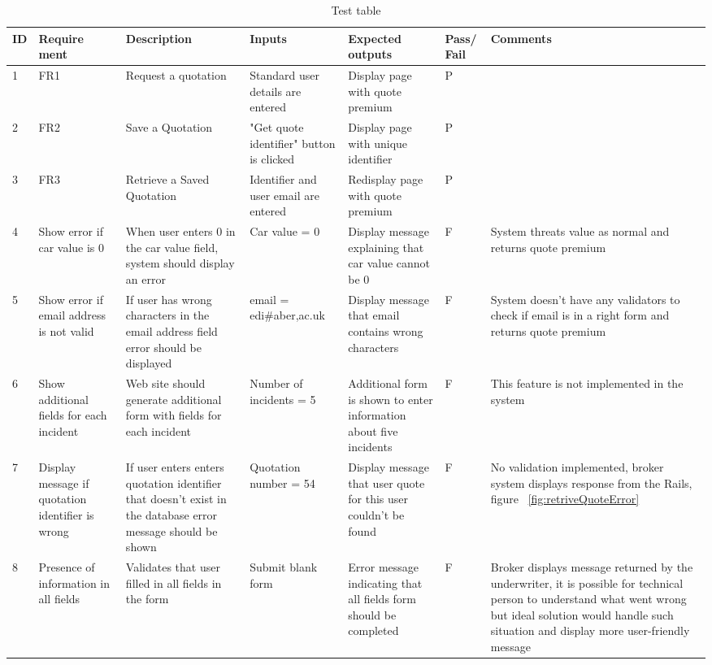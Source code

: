 \documentclass[10pt,a4paper,headinclude=true,twoside]{report}
\begin{document}
\begin{center}
\begin{table}


\begin{tabularx}{\textwidth} { |p{0.14cm}|p{0.88cm}|X|X|X|p{0.6cm}|X|}
   \hline                        
  ID &  Require ment & Description &  Inputs  &  Expected outputs & Pass/ Fail & Comments  \\ \hline
   1 & FR1 &  Request a quotation & Standard user details are entered &  Display page with quote premium & P &  \\ \hline
   2 & FR2 & Save a Quotation & "Get quote identifier" button is clicked &  Display page with unique identifier & P &  \\ \hline
   3 & FR3 & Retrieve a Saved Quotation & Identifier and user email are entered &  Redisplay page with quote premium & P & \\ \hline
   4 & Show error if car value is 0 & When user enters 0 in the car value field, system should display an error &  Car value = 0 &  Display message explaining that car value cannot be 0 & F & System threats value as normal and returns quote premium\\ \hline
   5 & Show error if email address is not valid & If user has wrong characters in the email address field error should be displayed& email = edi\#aber,ac.uk &  Display message that email contains wrong characters & F & System doesn't have any validators to check if email is in a right form and returns quote premium\\ \hline
   6 & Show additional fields for each incident & Web site should generate additional form with fields for each incident& Number of incidents = 5  &  Additional form is shown to enter information about five incidents & F & This feature is not implemented in the system\\ \hline
   7 & Display message if quotation identifier is wrong&  If user enters enters quotation identifier that doesn't exist in the database error message should be shown  &Quotation number = 54  &  Display message that user quote for this user couldn't be found & F & No validation implemented, broker system displays response from the Rails, figure ~\ref{fig:retriveQuoteError}\\ \hline
   8 & Presence of information in all fields &  Validates that user filled in all fields in the form &  Submit blank form & Error message indicating that all fields form should be completed & F & Broker displays message returned by the underwriter, it is possible for technical person to understand what went wrong but ideal solution would handle such situation and display more user-friendly message \\ \hline
   
   
   \hline  
   
\end{tabularx}
\caption{Test table}
\label{fig:testing}
\end{table}
\end{center}
\end{document}

